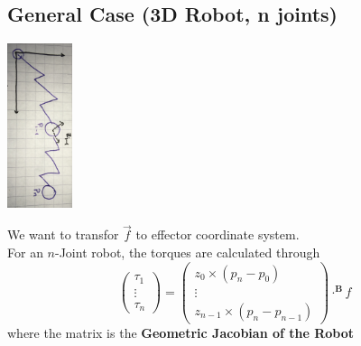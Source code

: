 \documentclass{exerciseBlue}
\begin{document}
\subsection{General Case (3D Robot, n joints)}
\begin{center}
	\includegraphics[height = 4.8cm]{Images/GeneralJacob}
\end{center}
We want to transfor $\vec{f}$ to effector coordinate system.\\
For an $n$-Joint robot, the torques are calculated through
$$\begin{pmatrix}
\tau_1\\\vdots\\\tau_n
\end{pmatrix} = \begin{pmatrix}
z_0 \times (p_n - p_0)\\\vdots\\ z_{n-1} \times (p_n - p_{n-1})
\end{pmatrix}\cdot ^\textbf{B}f$$
where the matrix is the \textbf{Geometric Jacobian of the Robot}
\newpage
\end{document}

